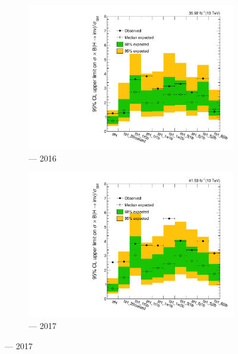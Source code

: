 \begin{figure}[htbp]
    \centering
    \begin{subfigure}[b]{0.45\textwidth}
        \includegraphics[width=\textwidth]{figures/limits/ttH/limit_2016_ttH.pdf}
        \caption{\ttH --- 2016}
    \end{subfigure}
    \hfill
    \begin{subfigure}[b]{0.45\textwidth}
        \includegraphics[width=\textwidth]{figures/limits/ttH/limit_2017_ttH.pdf}
        \caption{\ttH --- 2017}
    \end{subfigure}


\end{figure}
